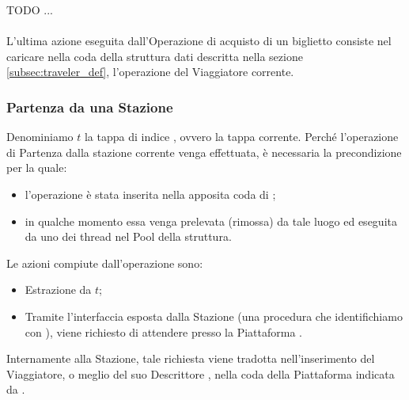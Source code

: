 	TODO
	...
	\\
	\\
	
	L'ultima azione eseguita dall'Operazione di acquisto di un biglietto consiste nel caricare nella coda della struttura dati  descritta nella sezione \ref{subsec:traveler_def}, l'operazione  del Viaggiatore corrente.
	
	\subsubsection{Partenza da una Stazione}
	
	Denominiamo $t$ la tappa di indice , ovvero la tappa corrente. Perché l'operazione di Partenza dalla stazione corrente venga effettuata, è necessaria la precondizione per la quale:
	\begin{itemize}
		\item l'operazione  è stata inserita nella apposita coda di ;
		\item in qualche momento essa venga prelevata (rimossa) da tale luogo ed eseguita da uno dei thread nel Pool della struttura. 
	\end{itemize}
Le azioni compiute dall'operazione  sono:
	
	\begin{itemize}
		\item Estrazione  da $t$;
		\item Tramite l'interfaccia esposta dalla Stazione  (una procedura che identifichiamo con ), viene richiesto di attendere presso la Piattaforma .
	\end{itemize} 
	
	Internamente alla Stazione, tale richiesta viene tradotta nell'inserimento del Viaggiatore, o meglio del suo Descrittore , nella coda  della Piattaforma indicata da .
	
